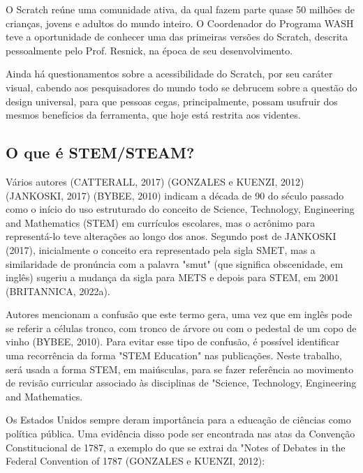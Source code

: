 O Scratch reúne uma comunidade ativa, da qual fazem parte quase 50 milhões de crianças, jovens e adultos do mundo inteiro. O Coordenador do Programa WASH teve a oportunidade de conhecer uma das primeiras versões do Scratch, descrita pessoalmente pelo Prof. Resnick, na época de seu desenvolvimento.

Ainda há questionamentos sobre a acessibilidade do Scratch, por seu caráter visual, cabendo aos pesquisadores do mundo todo se debrucem sobre a questão do design universal, para que pessoas cegas, principalmente, possam usufruir dos mesmos benefícios da ferramenta, que hoje está restrita aos videntes.

\subsection[O que é STEM/STEAM?]{O que é STEM/STEAM?}\label{O que é STEM/STEAM?}
Vários autores (CATTERALL, 2017)  (GONZALES e KUENZI, 2012)  (JANKOSKI, 2017)  (BYBEE, 2010) indicam a década de 90 do século passado como o início do uso estruturado do conceito de Science, Technology, Engineering and Mathematics (STEM) em currículos escolares, mas o acrônimo para representá-lo teve alterações ao longo dos anos. 
Segundo post de  JANKOSKI (2017), inicialmente o conceito era representado pela sigla SMET, mas a similaridade de pronúncia com a palavra "smut" (que significa obscenidade, em inglês) sugeriu a mudança da sigla para METS e depois para STEM, em 2001  (BRITANNICA, 2022a).

Autores mencionam a confusão que este termo gera, uma vez que em inglês pode se referir a células tronco, com tronco de árvore ou com o pedestal de um copo de vinho  (BYBEE, 2010). Para evitar esse tipo de confusão, é possível identificar uma recorrência da forma "STEM Education" nas publicações. Neste trabalho, será usada a forma STEM, em maiúsculas, para se fazer referência ao movimento de revisão curricular associado às disciplinas de "Science, Technology, Engineering and Mathematics.

Os Estados Unidos sempre deram importância para a educação de ciências como política pública. Uma evidência disso pode ser encontrada nas atas da Convenção Constitucional de 1787, a exemplo do que se extrai da "Notes of Debates in the Federal Convention of 1787  (GONZALES e KUENZI, 2012):


\noindent\begin{flushright}\mbox{\linespread{1}\selectfont\centering{}}\end{flushright}


